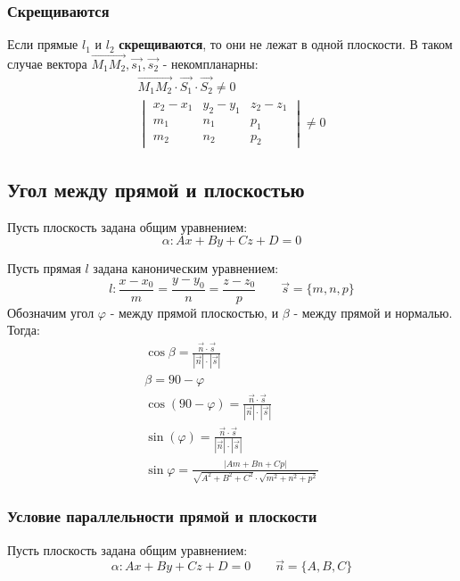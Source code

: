 \subsubsection{Скрещиваются}
Если прямые $l_1$ и $l_2$ \textbf{скрещиваются}, то они не лежат в одной плоскости.
В таком случае вектора $\overrightarrow{M_1M_2}, \vec{s_1}, \vec{s_2}$ - некомпланарны:
\begin{gather*}
  \overrightarrow{M_1M_2} \cdot \vec{S_1} \cdot \vec{S_2} \neq 0 \\
  \boxed{
    \begin{vmatrix}
      x_2 - x_1 & y_2 - y_1 & z_2 - z_1 \\
      m_1 & n_1 & p_1 \\
      m_2 & n_2 & p_2
    \end{vmatrix} \neq 0
  }
\end{gather*}


\subsection{Угол между прямой и плоскостью}

Пусть плоскость задана общим уравнением: \[
\alpha: Ax + By + Cz + D = 0
\] 

Пусть прямая $l$ задана каноническим уравнением:  \[
  l: \frac{x - x_0}{m} = \frac{y - y_0}{n} = \frac{z - z_0}{p} \qquad \vec{s} = \{m, n, p\} 
\] 
Обозначим угол $\varphi$ - между прямой плоскостью, и $\beta$ - между прямой и нормалью.
Тогда:
\begin{gather*}
  \cos \beta = \frac{\vec{n} \cdot \vec{s}}{|\vec{n}|\cdot|\vec{s}|} \\
  \beta = 90 - \varphi \\
  \cos(90 - \varphi) = \frac{\vec{n} \cdot \vec{s}}{|\vec{n}|\cdot|\vec{s}|} \\
  \sin(\varphi) = \frac{\vec{n} \cdot \vec{s}}{|\vec{n}|\cdot|\vec{s}|} \\
  \boxed{\sin \varphi = \frac{|Am + Bn + Cp|}{\sqrt{A^2 + B^2 + C^2} \cdot \sqrt{m^2 + n^2 + p^2} }}
\end{gather*}

\subsubsection{Условие параллельности прямой и плоскости}

Пусть плоскость задана общим уравнением: \[
  \alpha: Ax + By + Cz + D = 0 \qquad \vec{n} = \{A, B, C\} 
\] 

